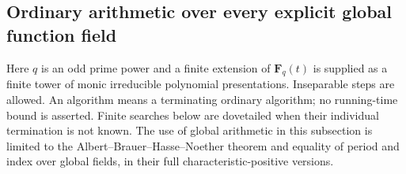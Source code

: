 \subsection{Ordinary arithmetic over every explicit global function field}
\label{C:global-function-arithmetic-subsection}

Here $q$ is an odd prime power and a finite extension of
$\mathbf F_q(t)$ is supplied as a finite tower of monic
irreducible polynomial presentations. Inseparable steps are
allowed. An algorithm means a terminating ordinary algorithm;
no running-time bound is asserted. Finite searches below are
dovetailed when their individual termination is not known.
The use of global arithmetic in this subsection is limited to
the Albert--Brauer--Hasse--Noether theorem and equality of
period and index over global fields, in their full
characteristic-positive versions.

